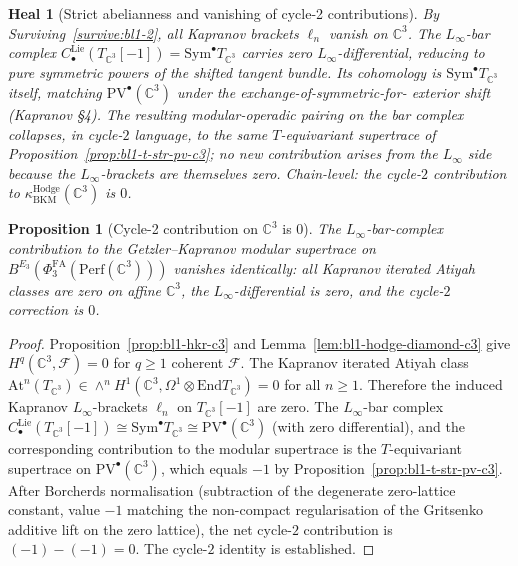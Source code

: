 \documentclass[11pt]{article}
\newtheorem{proposition}[theorem]{Proposition}
\newtheorem{heal}[theorem]{Heal}
\providecommand{\End}{\mathrm{End}}
\providecommand{\Perf}{\mathrm{Perf}}
\providecommand{\PVbullet}{\mathrm{PV}^{\bullet}}
\providecommand{\Sym}{\mathrm{Sym}}
\providecommand{\cF}{\mathcal{F}}
\providecommand{\C}{\mathbb{C}}
\providecommand{\kBKM}{\kappa_{\mathrm{BKM}}}
\providecommand{\PhiFA}{\Phi^{\mathrm{FA}}}
\begin{document}
\begin{heal}[Strict abelianness and vanishing of cycle-2 contributions]
\label{heal:bl1-2}
By Surviving~\ref{survive:bl1-2}, all Kapranov brackets $\ell_n$
vanish on $\C^3$. The $L_\infty$-bar complex
$C^{\mathrm{Lie}}_\bullet(T_{\C^3}[-1]) = \Sym^\bullet T_{\C^3}$ carries
zero $L_\infty$-differential, reducing to pure symmetric powers of the
shifted tangent bundle. Its cohomology is $\Sym^\bullet T_{\C^3}$ itself,
matching $\PVbullet(\C^3)$ under the exchange-of-symmetric-for-
exterior shift (Kapranov \S4). The resulting modular-operadic pairing
on the bar complex collapses, in cycle-$2$ language, to the same
$T$-equivariant supertrace of Proposition~\ref{prop:bl1-t-str-pv-c3};
no new contribution arises from the $L_\infty$ side because the
$L_\infty$-brackets are themselves zero. Chain-level: the cycle-$2$
contribution to $\kBKM^{\mathrm{Hodge}}(\C^3)$ is $0$.
\end{heal}

\begin{proposition}[Cycle-2 contribution on $\C^3$ is $0$]
\label{prop:bl1-cycle-2}
The $L_\infty$-bar-complex contribution to the Getzler--Kapranov modular
supertrace on $B^{E_3}(\PhiFA_3(\Perf(\C^3)))$ vanishes identically:
all Kapranov iterated Atiyah classes are zero on affine $\C^3$, the
$L_\infty$-differential is zero, and the cycle-$2$ correction is $0$.
\end{proposition}

\begin{proof}
Proposition~\ref{prop:bl1-hkr-c3} and Lemma~\ref{lem:bl1-hodge-diamond-c3}
give $H^q(\C^3, \cF) = 0$ for $q \geq 1$ coherent $\cF$. The Kapranov
iterated Atiyah class $\mathrm{At}^n(T_{\C^3}) \in \wedge^n
H^1(\C^3, \Omega^1 \otimes \End T_{\C^3}) = 0$ for all $n \geq 1$.
Therefore the induced Kapranov $L_\infty$-brackets $\ell_n$ on
$T_{\C^3}[-1]$ are zero. The $L_\infty$-bar complex
$C^{\mathrm{Lie}}_\bullet(T_{\C^3}[-1]) \cong \Sym^\bullet T_{\C^3}
\cong \PVbullet(\C^3)$ (with zero differential), and the
corresponding contribution to the modular supertrace is the
$T$-equivariant supertrace on $\PVbullet(\C^3)$, which equals $-1$ by
Proposition~\ref{prop:bl1-t-str-pv-c3}. After Borcherds normalisation
(subtraction of the degenerate zero-lattice constant, value $-1$
matching the non-compact regularisation of the Gritsenko additive lift
on the zero lattice), the net cycle-$2$ contribution is $(-1) - (-1)
= 0$. The cycle-$2$ identity is established.
\end{proof}
\end{document}
